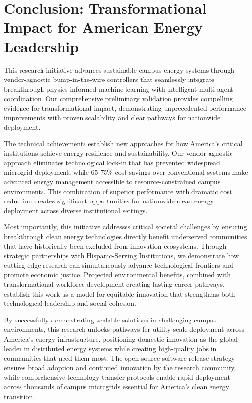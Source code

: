 \documentclass[12pt]{article}
\begin{document}
\section{Conclusion: Transformational Impact for American Energy Leadership}

This research initiative advances sustainable campus energy systems through vendor-agnostic bump-in-the-wire controllers that seamlessly integrate breakthrough physics-informed machine learning with intelligent multi-agent coordination. Our comprehensive preliminary validation provides compelling evidence for transformational impact, demonstrating unprecedented performance improvements with proven scalability and clear pathways for nationwide deployment.

The technical achievements establish new approaches for how America's critical institutions achieve energy resilience and sustainability. Our vendor-agnostic approach eliminates technological lock-in that has prevented widespread microgrid deployment, while 65-75\% cost savings over conventional systems make advanced energy management accessible to resource-constrained campus environments. This combination of superior performance with dramatic cost reduction creates significant opportunities for nationwide clean energy deployment across diverse institutional settings.

Most importantly, this initiative addresses critical societal challenges by ensuring breakthrough clean energy technologies directly benefit underserved communities that have historically been excluded from innovation ecosystems. Through strategic partnerships with Hispanic-Serving Institutions, we demonstrate how cutting-edge research can simultaneously advance technological frontiers and promote economic justice. Projected environmental benefits, combined with transformational workforce development creating lasting career pathways, establish this work as a model for equitable innovation that strengthens both technological leadership and social cohesion.

By successfully demonstrating scalable solutions in challenging campus environments, this research unlocks pathways for utility-scale deployment across America's energy infrastructure, positioning domestic innovation as the global leader in distributed energy systems while creating high-quality jobs in communities that need them most. The open-source software release strategy ensures broad adoption and continued innovation by the research community, while comprehensive technology transfer protocols enable rapid deployment across thousands of campus microgrids essential for America's clean energy transition.
\end{document}
